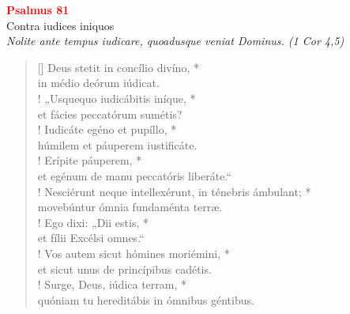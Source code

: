 


\def\greinitialformat#1{%
{\fontsize{39}{39}\selectfont #1}%
}




\vspace{0.3cm}
\begin{center}
 \textcolor{red}{\large \bf Psalmus 81}\\
Contra iudices iniquos\\
\textit{\small Nolite ante tempus iudicare, quoadusque veniat Dominus. (1 Cor 4,5)}
\end{center}
\begin{verse}[\versewidth]
Deus stetit in concílio divíno, *\\
in médio deórum iúdicat.\\!
\vin „Usquequo iudicábitis iníque, *\\
\vin et fácies peccatórum sumétis?\\!
Iudicáte egéno et pupíllo, *\\
húmilem et páuperem iustificáte.\\!
\vin Erípite páuperem, *\\
\vin et egénum de manu peccatóris liberáte.“\\!
Nesciérunt neque intellexérunt, in ténebris ámbulant; *\\
movebúntur ómnia fundaménta terræ.\\!
\vin Ego dixi: „Dii estis, *\\
\vin et fílii Excélsi omnes.“\\!
Vos autem sicut hómines moriémini, *\\
et sicut unus de princípibus cadétis.\\!
\vin Surge, Deus, iúdica terram, *\\
\vin quóniam tu hereditábis in ómnibus géntibus.\\
\end{verse}
\vspace{1cm}


